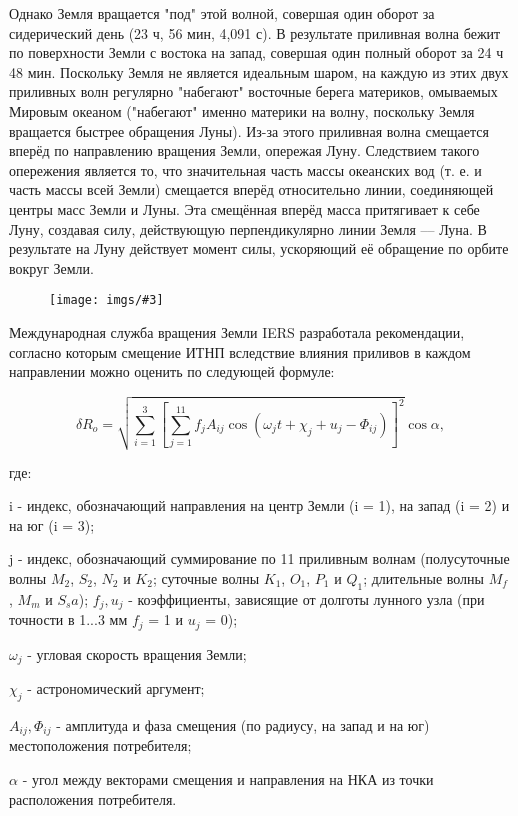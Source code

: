 \documentclass[14pt,a4paper,oneside]{extarticle}
\newcommand{\pic}[3]{
	\begin{figure}[#1]
		\begin{center}
			\texttt{[image: imgs/\#3]}
		\end{center}
	\end{figure}
}
\begin{document}
Однако Земля вращается "под" этой волной, совершая один оборот за сидерический день (23 ч, 56 мин, 4,091 с).
В результате приливная волна бежит по поверхности Земли с востока на запад, совершая один полный оборот за 24 ч 48 мин.
Поскольку Земля не является идеальным шаром, на каждую из этих двух приливных волн регулярно "набегают" восточные берега материков, омываемых Мировым океаном ("набегают" именно материки на волну, поскольку Земля вращается быстрее обращения Луны). 
Из-за этого приливная волна смещается вперёд по направлению вращения Земли, опережая Луну. Следствием такого опережения является то, что значительная часть массы океанских вод (т. е. и часть массы всей Земли) смещается вперёд относительно линии, соединяющей центры масс Земли и Луны.
Эта смещённая вперёд масса притягивает к себе Луну, создавая силу, действующую перпендикулярно линии Земля –– Луна.
В результате на Луну действует момент силы, ускоряющий её обращение по орбите вокруг Земли.

\pic{H}{\textwidth}{11}

Международная служба вращения Земли IERS разработала рекомендации, согласно которым смещение ИТНП вследствие влияния приливов в каждом направлении можно оценить по следующей формуле:

\[\delta R_o =\sqrt{\sum_{i=1}^{3}\left[\sum_{j=1}^{11}f_{j}A_{ij}\cos(\omega_{j}t+\chi_{j}+u_{j}-\Phi_{ij})\right]^{2}}\cos\alpha,\]

где:

i - индекс, обозначающий направления на центр Земли (i = 1), на запад (i = 2) и на юг (i = 3); 

j - индекс, обозначающий суммирование по 11 приливным волнам (полусуточные волны $M_2$, $S_2$, $N_2$ и $K_2$; суточные волны $K_1$, $O_1$, $P_1$ и $Q_1$; длительные волны $M_f$ , $M_m$ и $S_sa$);
$f_j, u_j$ - коэффициенты, зависящие от долготы лунного узла (при точности в 1...3 мм $f_j$ = 1 и $u_j$ = 0); 

$\omega_{j}$ - угловая скорость вращения Земли; 

$\chi_{j}$ - астрономический аргумент; 

$A_{ij}, \Phi_{ij}$ - амплитуда и фаза смещения (по радиусу, на запад и на юг) местоположения потребителя; 

$\alpha$ - угол между векторами смещения и направления на НКА из точки расположения потребителя.
\end{document}

